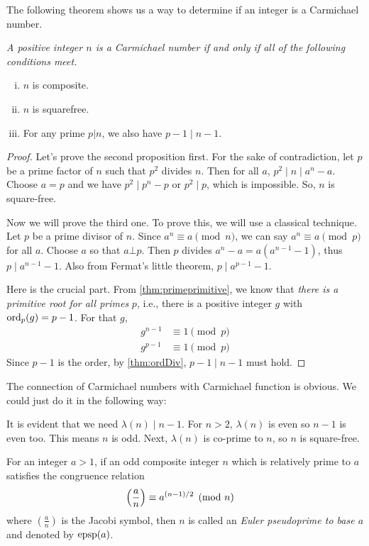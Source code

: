 The following theorem shows us a way to determine if an integer is a Carmichael number.

\begin{theorem}\slshape
	A positive integer $n$ is a Carmichael number if and only if all of the following conditions meet.
	\begin{enumerate}[i.]
		\item $n$ is composite.
		\item $n$ is squarefree.
		\item For any prime $p|n$, we also have $p-1 \mid n-1$.
	\end{enumerate}
\end{theorem}

\begin{proof}
	Let's prove the second proposition first. For the sake of contradiction, let $p$ be a prime factor of $n$ such that $p^2$ divides $n$. Then for all $a$, $p^2 \mid n \mid a^n-a$. Choose $a=p$ and we have $p^2 \mid p^n-p$ or $p^2 \mid p$, which is impossible. So, $n$ is square-free.

	Now we will prove the third one. To prove this, we will use a classical technique. Let $p$ be a prime divisor of $n$. Since $a^n\equiv a\pmod n$, we can say $a^n\equiv a\pmod p$ for all $a$. Choose $a$ so that $a\bot p$. Then $p$ divides $a^n-a=a(a^{n-1}-1)$, thus $p \mid a^{n-1}-1$. Also from Fermat's little theorem, $p \mid a^{p-1}-1$.

	Here is the crucial part. From \autoref{thm:primeprimitive}, we know that \textit{there is a primitive root for all primes} $p$, i.e., there is a positive integer $g$ with $\operatorname{ord}_p(g)=p-1$. For that $g$,
	\begin{align*}
		g^{n-1}
			& \equiv1\pmod p\\
		g^{p-1}
			& \equiv1\pmod p
	\end{align*}
	Since $p-1$ is the order, by \autoref{thm:ordDiv}, $p-1 \mid n-1$ must hold.
\end{proof}

\begin{note}
	The connection of Carmichael numbers with Carmichael function is obvious. We could just do it in the following way:

	It is evident that we need $\lambda(n)\mid n-1$. For $n>2$, $\lambda(n)$ is even so $n-1$ is even too. This means $n$ is odd. Next, $\lambda(n)$ is co-prime to $n$, so $n$ is square-free.
\end{note}

\begin{definition}\label{def:eulerpseudoprime}
	For an integer $a>1$, if an odd composite integer $n$ which is relatively prime to $a$ satisfies the congruence relation
		\begin{align*}
			\left(\dfrac{a}{n}\right)
				& \equiv a^{(n-1)/2} \pmod n
		\end{align*}
	where $\left(\frac{a}{n}\right)$ is the Jacobi symbol, then $n$ is called an \textit{Euler pseudoprime to base $a$} and denoted by $\operatorname{epsp}(a)$.
\end{definition}

